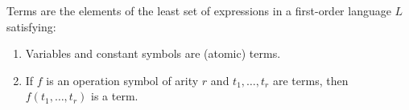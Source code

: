 Terms are the elements of the least set of expressions in a first-order language $L$ satisfying:
\begin{enumerate}
\item[(a)] Variables and constant symbols are (atomic) terms.
\item[(b)] If $f$ is an operation symbol of arity $r$ and $t_1, \ldots, t_r$ are terms, then $f(t_1, \ldots, t_r)$ is a term.
\end{enumerate}

